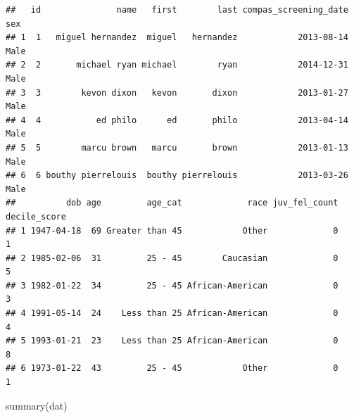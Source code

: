\documentclass[
]{article}
\newenvironment{Shaded}{\begin{snugshade}}{\end{snugshade}}
\newcommand{\FunctionTok}[1]{\textcolor[rgb]{0.00,0.00,0.00}{#1}}
\newcommand{\NormalTok}[1]{#1}
\begin{document}
\begin{verbatim}
##   id               name   first        last compas_screening_date  sex
## 1  1   miguel hernandez  miguel   hernandez            2013-08-14 Male
## 2  2       michael ryan michael        ryan            2014-12-31 Male
## 3  3        kevon dixon   kevon       dixon            2013-01-27 Male
## 4  4           ed philo      ed       philo            2013-04-14 Male
## 5  5        marcu brown   marcu       brown            2013-01-13 Male
## 6  6 bouthy pierrelouis  bouthy pierrelouis            2013-03-26 Male
##          dob age         age_cat             race juv_fel_count decile_score
## 1 1947-04-18  69 Greater than 45            Other             0            1
## 2 1985-02-06  31         25 - 45        Caucasian             0            5
## 3 1982-01-22  34         25 - 45 African-American             0            3
## 4 1991-05-14  24    Less than 25 African-American             0            4
## 5 1993-01-21  23    Less than 25 African-American             0            8
## 6 1973-01-22  43         25 - 45            Other             0            1
\end{verbatim}

\begin{Shaded}
\begin{Highlighting}[]
\FunctionTok{summary}\NormalTok{(dat)}
\end{Highlighting}
\end{Shaded}
\end{document}
